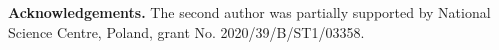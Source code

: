 \documentclass[a4paper]{amsart}
\theoremstyle{plain}
\newtheorem{Cor}[Thm]{Corollary}
\theoremstyle{definition}
\theoremstyle{remark}
\numberwithin{equation}{section}
\begin{document}
%




\textbf{Acknowledgements.} The second author was partially supported by National Science Centre, Poland, grant No. 2020/39/B/ST1/03358.
\end{document}
